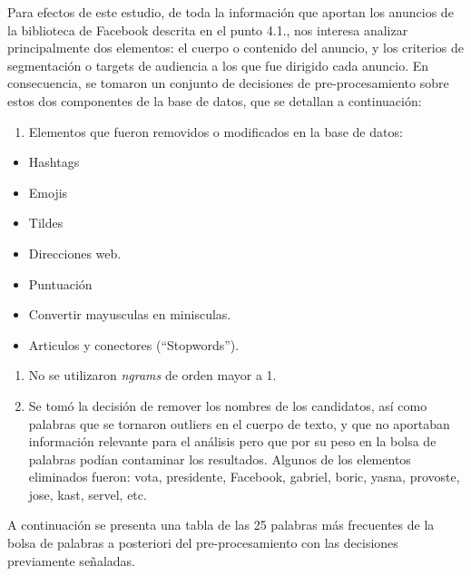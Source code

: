 \documentclass[
  10pt,
  letterpaper,
]{report}
\providecommand{\tightlist}{%
  \setlength{\itemsep}{0pt}\setlength{\parskip}{0pt}}
\begin{document}
Para efectos de este estudio, de toda la información que aportan los
anuncios de la biblioteca de Facebook descrita en el punto 4.1., nos
interesa analizar principalmente dos elementos: el cuerpo o contenido
del anuncio, y los criterios de segmentación o targets de audiencia a
los que fue dirigido cada anuncio. En consecuencia, se tomaron un
conjunto de decisiones de pre-procesamiento sobre estos dos componentes
de la base de datos, que se detallan a continuación:

\begin{enumerate}
\def\labelenumi{\arabic{enumi}.}
\tightlist
\item
  Elementos que fueron removidos o modificados en la base de datos:
\end{enumerate}

\begin{itemize}
\tightlist
\item
  Hashtags
\item
  Emojis
\item
  Tildes
\item
  Direcciones web.
\item
  Puntuación
\item
  Convertir mayusculas en minisculas.
\item
  Articulos y conectores (``Stopwords'').
\end{itemize}

\begin{enumerate}
\def\labelenumi{\arabic{enumi}.}
\setcounter{enumi}{1}
\item
  No se utilizaron \emph{ngrams} de orden mayor a 1.
\item
  Se tomó la decisión de remover los nombres de los candidatos, así como
  palabras que se tornaron outliers en el cuerpo de texto, y que no
  aportaban información relevante para el análisis pero que por su peso
  en la bolsa de palabras podían contaminar los resultados. Algunos de
  los elementos eliminados fueron: vota, presidente, Facebook, gabriel,
  boric, yasna, provoste, jose, kast, servel, etc.
\end{enumerate}

A continuación se presenta una tabla de las 25 palabras más frecuentes
de la bolsa de palabras a posteriori del pre-procesamiento con las
decisiones previamente señaladas.
\end{document}
